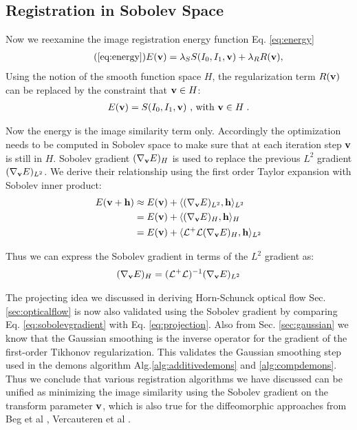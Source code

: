\documentclass[letterpaper,12pt]{article}
\begin{document}
\subsection{Registration in Sobolev Space}

Now we reexamine the image registration energy function Eq. \ref{eq:energy}
\begin{align}
\tag{\ref{eq:energy}}
\myE(\v) = \lambda_S \myS(\I_0,\I_1,\v) + \lambda_R \myR(\v),
\end{align}
Using the notion of the smooth function space $H$, the regularization term $R(\mathbf{v})$ can be replaced by the constraint that $\mathbf{v} \in H$:
\begin{align}
\label{eq:sobolevenergy}
E(\mathbf{v}) = S(I_0,I_1,\mathbf{v}) \text{  , with }  \mathbf{v} \in H \; .
\end{align}

Now the energy is the image similarity term only. Accordingly the optimization needs to be computed in Sobolev space to make sure that at each iteration step $\mathbf{v}$ is still in $H$. Sobolev gradient $(\nabla_{\mathbf{v}} E)_H$ is used to replace the previous $L^2$ gradient $(\nabla_{\mathbf{v}} E)_{L^2}$. We derive their relationship using the first order Taylor expansion with Sobolev inner product:
\begin{equation}
\begin{split}
E(\mathbf{v} + \mathbf{h}) 
& \approx E(\mathbf{v}) + \langle (\nabla_{\mathbf{v}}E)_{L^2} , \mathbf{h} \rangle_{L^2} 
\\
& = E(\mathbf{v}) + \langle (\nabla_{\mathbf{v}}E)_{H} , \mathbf{h} \rangle_H
\\
& = E(\mathbf{v}) + \langle \mathcal{L}^+\mathcal{L} (\nabla_{\mathbf{v}}E)_{H}  , \mathbf{h} \rangle_{L^2}
\end{split}
\end{equation}

Thus we can express the Sobolev gradient in terms of the $L^2$ gradient as:
\begin{align}
\label{eq:sobolevgradient}
(\nabla_{\mathbf{v}}E)_{H} = (\mathcal{L}^+\mathcal{L})^{-1} (\nabla_{\mathbf{v}}E)_{L^2}
\end{align}

The projecting idea we discussed in deriving Horn-Schunck optical flow Sec. \ref{sec:opticalflow} is now also validated using the Sobolev gradient by comparing Eq. \ref{eq:sobolevgradient} with Eq. \ref{eq:projection}. Also from Sec. \ref{sec:gaussian} we know that the Gaussian smoothing is the inverse operator for the gradient of the first-order Tikhonov regularization. This validates the Gaussian smoothing step used in the demons algorithm Alg.\ref{alg:additivedemons} and \ref{alg:compdemons}. Thus we conclude that various registration algorithms we have discussed can be unified as minimizing the image similarity using the Sobolev gradient on the transform parameter $\mathbf{v}$, which is also true for the diffeomorphic approaches from Beg et al \cite{Beg2005Computing}, Vercauteren et al \cite{Vercauteren2007, Vercauteren2008Symmetric}.
\end{document}
